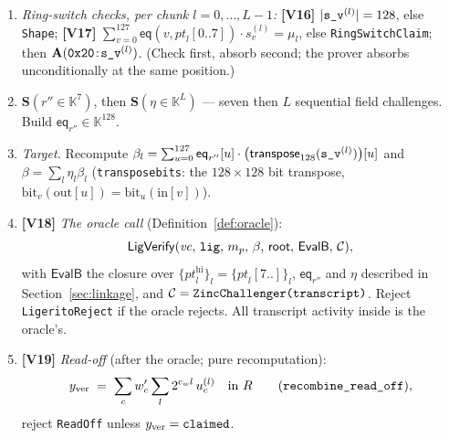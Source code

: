 \documentclass[11pt]{article}
\newcommand{\K}{\mathbb{K}}            %
\newcommand{\eq}{\mathsf{eq}}
\newcommand{\cw}{c_w}
\newcommand{\code}[1]{{\def\_{\textunderscore\allowbreak}\texttt{#1}}}
\newcommand{\RecVerify}{\mathsf{LigVerify}}
\newcommand{\Vc}[1]{\textbf{[V#1]}}    %
\begin{document}
\begin{enumerate}[leftmargin=2.2em, itemsep=2pt]
\begin{enumerate}[leftmargin=1.6em, itemsep=1pt]
\begin{enumerate}[leftmargin=1.6em, itemsep=1pt]
    \item \Vc{14} $\code{presums[l].claimed\_sums()} = [\,e_d^{(l)} + 1\,]$
      (one group, exactly this value), else \code{PreSumcheck}.
    \item Recompute
      $\widehat{R}^{(l)} = \sum_i q^{(l)}_{\mathrm{rowbit}}[i]\cdot
       \eq(i, r^{*(l)})$ with
      $q^{(l)}_{\mathrm{rowbit}}[i] = \eq(i, z_x^{(l)})\cdot
       (\alpha^{W^{(l)}_b 2^j} - 1)$, $i = (b \ll \log_2 W)|j$
      (\code{row\_bit\_weights}; the verifier's one $O(2^{d})$ step).
      \Vc{15} $\widehat{R}^{(l)} \ne 0$, else \code{RHatZero}.  Set
      $\mu_l = E^{(l)} \cdot (\widehat{R}^{(l)})^{-1}$ and
      $\mathit{pt}_l = (r^{*(l)} \,\|\, z_c^{(l)}) \in \K^{d+s}$.
    \end{enumerate}
  \end{enumerate}

\item \emph{Ring-switch checks, per chunk $l = 0, \dots, L-1$:}
  \Vc{16} $|\code{s\_v}^{(l)}| = 128$, else \code{Shape};
  \Vc{17} $\sum_{v=0}^{127} \eq(v, \mathit{pt}_l[0..7]) \cdot s^{(l)}_v
   = \mu_l$, else \code{RingSwitchClaim}; then
  $\mathbf{A}(\mathtt{0x20}\!:\!\code{s\_v}^{(l)})$.
  (Check first, absorb second; the prover absorbs unconditionally at the
  same position.)

\item $\mathbf{S}(r'' \in \K^{7})$, then
  $\mathbf{S}(\eta \in \K^{L})$ — seven then $L$ sequential field
  challenges.  Build $\eq_{r''} \in \K^{128}$.

\item \emph{Target.}  Recompute
  $\beta_l = \sum_{u=0}^{127} \eq_{r''}[u] \cdot
   \big(\mathsf{transpose}_{128}(\code{s\_v}^{(l)})\big)[u]$
  and $\beta = \sum_l \eta_l \beta_l$
  (\code{transpose\_bits\_128}: the $128\times128$ bit transpose,
  $\mathrm{bit}_v(\mathrm{out}[u]) = \mathrm{bit}_u(\mathrm{in}[v])$).

\item \Vc{18} \emph{The oracle call} (Definition~\ref{def:oracle}):
  \[
    \RecVerify(\mathit{vc},\, \code{lig},\, m_p,\, \beta,\, \mathsf{root},\,
     \mathsf{EvalB},\, \mathcal{C}),
  \]
  with $\mathsf{EvalB}$ the closure over
  $\{\mathit{pt}_l^{\mathrm{hi}}\}_l = \{\mathit{pt}_l[7..]\}_l$,
  $\eq_{r''}$ and $\eta$ described in Section~\ref{sec:linkage}, and
  $\mathcal{C} = \code{ZincChallenger(transcript)}$.  Reject
  \code{LigeritoReject} if the oracle rejects.  All transcript activity
  inside is the oracle's.

\item \Vc{19} \emph{Read-off} (after the oracle; pure recomputation):
  \[
    y_{\mathrm{ver}} \;=\; \sum_{c} w'_c \sum_{l} 2^{\cw l}\, u^{(l)}_c
    \quad\text{in } R
    \qquad (\code{recombine\_read\_off}),
  \]
  reject \code{ReadOff} unless $y_{\mathrm{ver}} = \code{claimed}$.
\end{enumerate}
\end{document}
